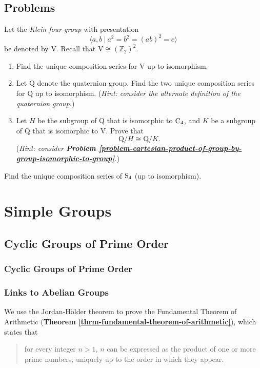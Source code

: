 \section{Problems}
\begin{problem}
    Let the \textit{Klein four-group} with presentation
    \[
        \langle a, b \ | \ a^2 = b^2 = (ab)^2 = e \rangle
    \]
    be denoted by $\mathrm{V}$. Recall that $\mathrm{V} \cong (\mathbb{Z}_2)^2$.
    \begin{enumerate}[label=(\roman*)]
        \item Find the unique composition series for $\mathrm{V}$ up to isomorphism.
        \item Let $\mathrm{Q}$ denote the quaternion group. Find the two unique composition series for $\mathrm{Q}$ up to isomorphism.\newline
        (\textit{Hint: consider the alternate definition of the quaternion group.})
        \item Let $H$ be the subgroup of $\mathrm{Q}$ that is isomorphic to $\mathrm{C}_{4}$, and $K$ be a subgroup of $\mathrm{Q}$ that is isomorphic to $\mathrm{V}$. Prove that
        \[
            \mathrm{Q}/H \cong \mathrm{Q}/K.
        \]
        (\textit{Hint: consider \textbf{Problem \ref{problem-cartesian-product-of-group-by-group-isomorphic-to-group}}.})
    \end{enumerate}
\end{problem}

\begin{problem}
    Find the unique composition series of $\mathrm{S}_{4}$ (up to isomorphism).
\end{problem}

\chapter{Simple Groups}
\section{Cyclic Groups of Prime Order}
\subsection{Cyclic Groups of Prime Order}
\subsection{Links to Abelian Groups}

\begin{example}
    We use the Jordan-H\"older theorem to prove the Fundamental Theorem of Arithmetic (\textbf{Theorem \ref{thrm-fundamental-theorem-of-arithmetic}}), which states that
    \begin{quote}
        for every integer $n > 1$, $n$ can be expressed as the product of one or more prime numbers, uniquely up to the order in which they appear.
    \end{quote}
    
\end{example}

